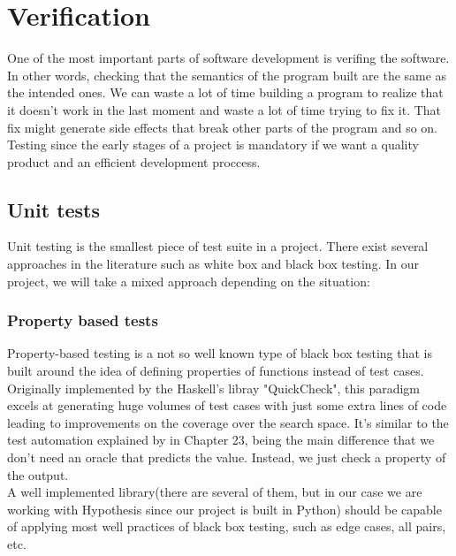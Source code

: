 \section{Verification}
  One of the most important parts of software development is verifing the
  software. In other words, checking that the semantics of the program built
  are the same as the intended ones. We can waste a lot of time building a
  program to realize that it doesn't work in the last moment and waste a lot
  of time trying to fix it. That fix might generate side effects that break other
  parts of the program and so on. Testing since the early stages of a project
  is mandatory if we want a quality product and an efficient development
  proccess.

  \subsection{Unit tests}

    Unit testing is the smallest piece of test suite in a project. There exist
    several approaches in the literature such as white box and black box
    testing. In our project, we will take a mixed approach depending on the
    situation:

    \subsubsection{Property based tests}

    Property-based testing is a not so well known type of black box testing that
    is built around the idea of defining properties of functions instead of
    test cases. Originally implemented by the Haskell's libray
    "QuickCheck"\cite{QuickCheck}, this paradigm excels at generating huge
    volumes of test cases with just some extra lines of code leading
    to improvements on the coverage over the search space. It's similar to the
    test automation explained by \citet{Sommerville} in Chapter 23, being the
    main difference that we don't need an oracle that predicts the value.
    Instead, we just check a property of the output.\\

    A well implemented library(there are several of them, but in our case we are
    working with Hypothesis\cite{Hypothesis} since our project is built in
    Python) should be capable of applying most well practices of black box
    testing, such as edge cases, all pairs, etc.\\

